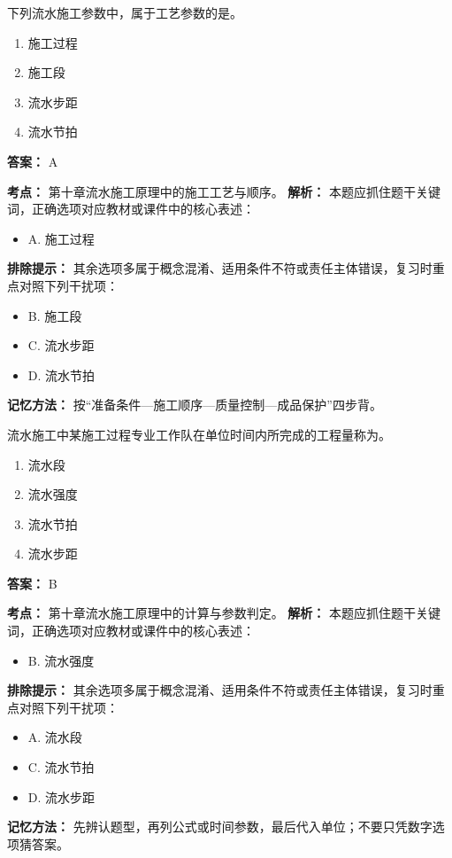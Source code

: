 \documentclass[UTF8,fontset=fandol,11pt]{ctexart}
\begin{document}
\vspace{0.2em}

\begin{quizbox}[title={第 3 题}]
下列流水施工参数中，属于工艺参数的是。\\
\begin{enumerate}[label=\Alph*.]
\item 施工过程
\item 施工段
\item 流水步距
\item 流水节拍
\end{enumerate}
\textbf{答案：} A
\vspace{0.25em}
\begin{answerbox}[title={考点解析}]
\textbf{考点：} 第十章流水施工原理中的施工工艺与顺序。
\textbf{解析：} 本题应抓住题干关键词，正确选项对应教材或课件中的核心表述：
\begin{itemize}
\item A. 施工过程
\end{itemize}
\textbf{排除提示：} 其余选项多属于概念混淆、适用条件不符或责任主体错误，复习时重点对照下列干扰项：
\begin{itemize}
\item B. 施工段
\item C. 流水步距
\item D. 流水节拍
\end{itemize}
\textbf{记忆方法：} 按“准备条件—施工顺序—质量控制—成品保护”四步背。
\end{answerbox}
\end{quizbox}

\vspace{0.2em}

\begin{quizbox}[title={第 4 题}]
流水施工中某施工过程专业工作队在单位时间内所完成的工程量称为。\\
\begin{enumerate}[label=\Alph*.]
\item 流水段
\item 流水强度
\item 流水节拍
\item 流水步距
\end{enumerate}
\textbf{答案：} B
\vspace{0.25em}
\begin{answerbox}[title={考点解析}]
\textbf{考点：} 第十章流水施工原理中的计算与参数判定。
\textbf{解析：} 本题应抓住题干关键词，正确选项对应教材或课件中的核心表述：
\begin{itemize}
\item B. 流水强度
\end{itemize}
\textbf{排除提示：} 其余选项多属于概念混淆、适用条件不符或责任主体错误，复习时重点对照下列干扰项：
\begin{itemize}
\item A. 流水段
\item C. 流水节拍
\item D. 流水步距
\end{itemize}
\textbf{记忆方法：} 先辨认题型，再列公式或时间参数，最后代入单位；不要只凭数字选项猜答案。
\end{answerbox}
\end{quizbox}
\end{document}
